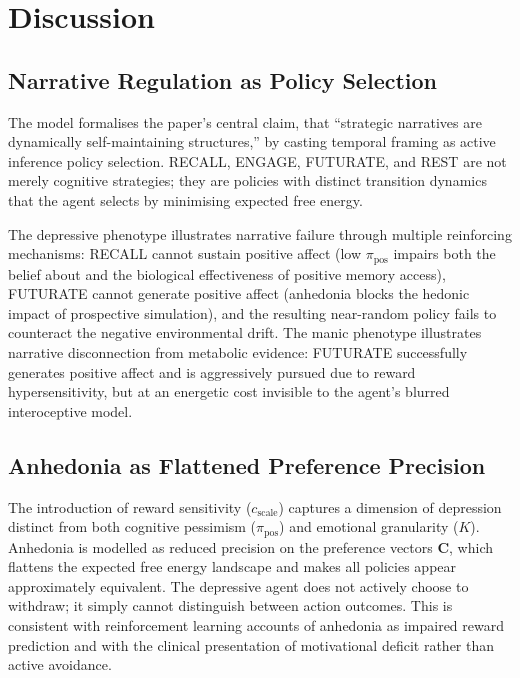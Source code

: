 \documentclass[11pt,a4paper]{article}
\begin{document}
\section{Discussion}\label{sec:discussion}

\subsection{Narrative Regulation as Policy Selection}

The model formalises the paper's central claim, that ``strategic narratives are dynamically self-maintaining structures,'' by casting temporal framing as active inference policy selection. RECALL, ENGAGE, FUTURATE, and REST are not merely cognitive strategies; they are policies with distinct transition dynamics that the agent selects by minimising expected free energy.

The depressive phenotype illustrates narrative failure through multiple reinforcing mechanisms: RECALL cannot sustain positive affect (low $\pi_{\text{pos}}$ impairs both the belief about and the biological effectiveness of positive memory access), FUTURATE cannot generate positive affect (anhedonia blocks the hedonic impact of prospective simulation), and the resulting near-random policy fails to counteract the negative environmental drift. The manic phenotype illustrates narrative disconnection from metabolic evidence: FUTURATE successfully generates positive affect and is aggressively pursued due to reward hypersensitivity, but at an energetic cost invisible to the agent's blurred interoceptive model.

\subsection{Anhedonia as Flattened Preference Precision}

The introduction of reward sensitivity ($c_{\text{scale}}$) captures a dimension of depression distinct from both cognitive pessimism ($\pi_{\text{pos}}$) and emotional granularity ($K$). Anhedonia is modelled as reduced precision on the preference vectors $\mathbf{C}$, which flattens the expected free energy landscape and makes all policies appear approximately equivalent. The depressive agent does not actively choose to withdraw; it simply cannot distinguish between action outcomes. This is consistent with reinforcement learning accounts of anhedonia as impaired reward prediction \citep{huys2013mapping} and with the clinical presentation of motivational deficit rather than active avoidance.
\end{document}
